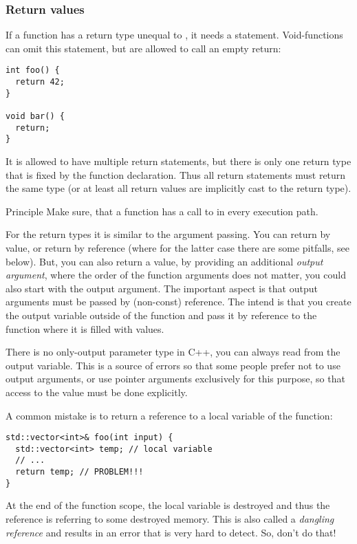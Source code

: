 \subsubsection{Return values}
If a function has a return type unequal to , it needs a  statement. Void-functions can omit this statement, but are allowed to
call an empty return:
\begin{verbatim}
int foo() {
  return 42;
}

void bar() {
  return;
}
\end{verbatim}

It is allowed to have multiple return statements, but there is only one return type that is fixed by the function declaration. Thus all return statements
must return the same type (or at least all return values are implicitly cast to the return type).

\begin{guideline}{Principle}
  Make sure, that a function has a call to  in every execution path.
\end{guideline}

For the return types it is similar to the argument passing. You can return by value, or return by reference (where for the latter case there
are some pitfalls, see below). But, you can also return a value, by providing an additional \emph{output argument}, \eg
%
%
where the order of the function arguments does not matter, \ie you could also start with the output argument. The important aspect is that
output arguments must be passed by (non-const) reference. The intend is that you create the output variable outside of the function and pass it by
reference to the function where it is filled with values.

\begin{rem}
  There is no only-output parameter type in C++, you can always read from the output variable. This is a source of errors so that some people prefer
  not to use output arguments, or use pointer arguments exclusively for this purpose, so that access to the value must be done explicitly.
\end{rem}

A common mistake is to return a reference to a local variable of the function:
\begin{verbatim}
std::vector<int>& foo(int input) {
  std::vector<int> temp; // local variable
  // ...
  return temp; // PROBLEM!!!
}
\end{verbatim}
At the end of the function scope, the local variable is destroyed and thus the reference is referring to some destroyed memory. This is also
called a \emph{dangling reference} and results in an error that is very hard to detect. So, don't do that!

